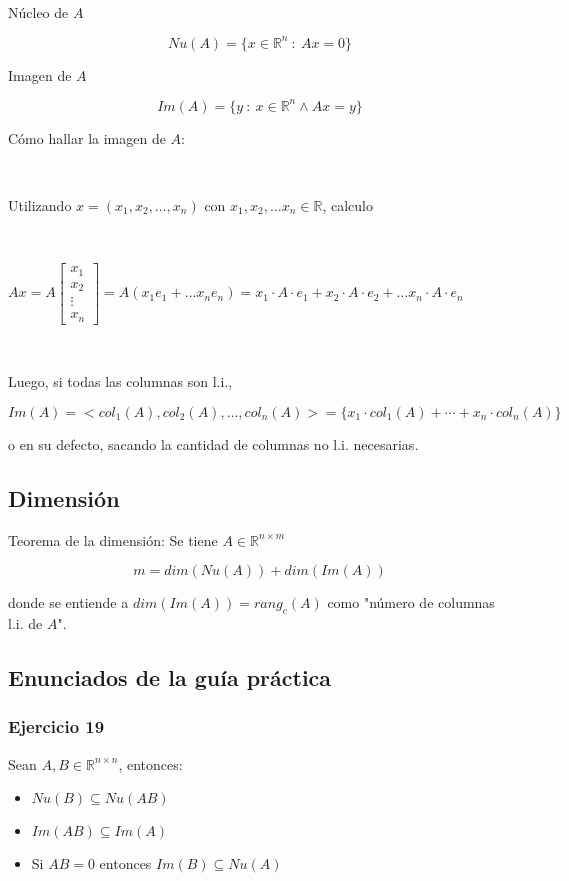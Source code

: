 \

Núcleo de $A$

\[Nu(A) = \{x \in \mathbb{R}^{n} ~:~ Ax = 0\}\]

Imagen de $A$

\[Im(A) = \{y ~:~ x \in \mathbb{R}^{n} \land Ax = y\}\]

Cómo hallar la imagen de $A$:

\

Utilizando $x = (x_1, x_2, \ldots, x_n)$ con $x_1,x_2,\ldots x_n \in \mathbb{R}$, calculo 

\

$Ax = A\begin{bmatrix}
x_1 \\
x_2 \\
\vdots \\
x_n
\end{bmatrix} = A(x_1 e_1 + \ldots x_n e_n) =
x_1\cdot A\cdot e_1 + x_2\cdot A\cdot e_2 + \ldots x_n\cdot A\cdot e_n$

\

Luego, si todas las columnas son l.i., 

\[Im(A) = <col_1(A), col_2(A),\ldots, col_n(A)> = \{x_1\cdot col_1(A) + \cdots + x_n \cdot col_n(A)\}\]

o en su defecto, sacando la cantidad de columnas no l.i. necesarias.

\subsection{Dimensión}\label{subsec:dimension_matriz}

Teorema de la dimensión: Se tiene $A \in \mathbb{R}^{n \times m}$

\[m = dim(Nu(A)) + dim(Im(A))\]

donde se entiende a $dim(Im(A)) = rang_c(A)$ como "número de columnas l.i. de $A$".

\newpage

\subsection{Enunciados de la guía práctica}\label{subsec:enunciados_guia_1}

\subsubsection{Ejercicio 19}\label{subsubsec:guia_1_ej_19}

Sean $A,B \in \mathbb{R}^{n \times n}$, entonces:
\begin{itemize}
    \item $Nu(B) \subseteq Nu(AB)$
    \item $Im(AB) \subseteq Im(A)$
    \item Si $AB = 0$ entonces $Im(B) \subseteq Nu(A)$
\end{itemize}

